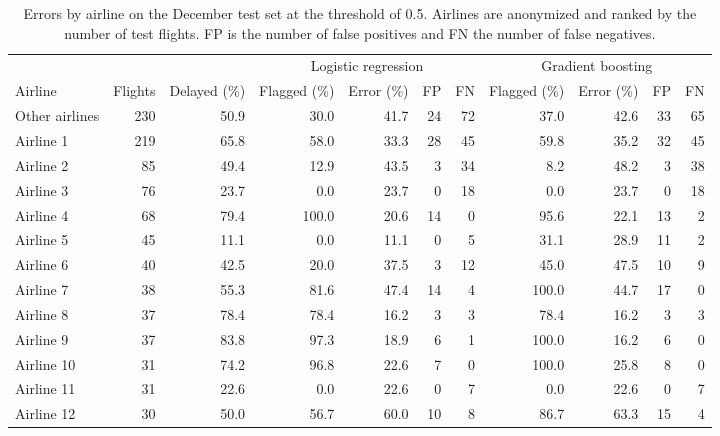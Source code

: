 \begin{table}[ht]
  \centering
  \caption{Errors by airline on the December test set at the threshold of 0.5. Airlines are anonymized and ranked by the number of test flights. FP is the number of false positives and FN the number of false negatives.}
  \label{tab:error_airline}
  \begin{threeparttable}
    \footnotesize
    \setlength{\tabcolsep}{2pt}
    \begin{tabular*}{\textwidth}{@{\extracolsep{\fill}}lrrrrrrrrrr@{}}
      \toprule
      & & & \multicolumn{4}{c}{Logistic regression} & \multicolumn{4}{c}{Gradient boosting} \\
      \cmidrule(lr){4-7} \cmidrule(lr){8-11}
      Airline & Flights & Delayed (\%) & Flagged (\%) & Error (\%) & FP & FN & Flagged (\%) & Error (\%) & FP & FN \\
      \midrule
      Other airlines & 230 & 50.9 & 30.0 & 41.7 & 24 & 72 & 37.0 & 42.6 & 33 & 65 \\
      Airline 1 & 219 & 65.8 & 58.0 & 33.3 & 28 & 45 & 59.8 & 35.2 & 32 & 45 \\
      Airline 2 & 85 & 49.4 & 12.9 & 43.5 & 3 & 34 & 8.2 & 48.2 & 3 & 38 \\
      Airline 3 & 76 & 23.7 & 0.0 & 23.7 & 0 & 18 & 0.0 & 23.7 & 0 & 18 \\
      Airline 4 & 68 & 79.4 & 100.0 & 20.6 & 14 & 0 & 95.6 & 22.1 & 13 & 2 \\
      Airline 5 & 45 & 11.1 & 0.0 & 11.1 & 0 & 5 & 31.1 & 28.9 & 11 & 2 \\
      Airline 6 & 40 & 42.5 & 20.0 & 37.5 & 3 & 12 & 45.0 & 47.5 & 10 & 9 \\
      Airline 7 & 38 & 55.3 & 81.6 & 47.4 & 14 & 4 & 100.0 & 44.7 & 17 & 0 \\
      Airline 8 & 37 & 78.4 & 78.4 & 16.2 & 3 & 3 & 78.4 & 16.2 & 3 & 3 \\
      Airline 9 & 37 & 83.8 & 97.3 & 18.9 & 6 & 1 & 100.0 & 16.2 & 6 & 0 \\
      Airline 10 & 31 & 74.2 & 96.8 & 22.6 & 7 & 0 & 100.0 & 25.8 & 8 & 0 \\
      Airline 11 & 31 & 22.6 & 0.0 & 22.6 & 0 & 7 & 0.0 & 22.6 & 0 & 7 \\
      Airline 12 & 30 & 50.0 & 56.7 & 60.0 & 10 & 8 & 86.7 & 63.3 & 15 & 4 \\

\end{tabular*}
\end{threeparttable}
\end{table}

